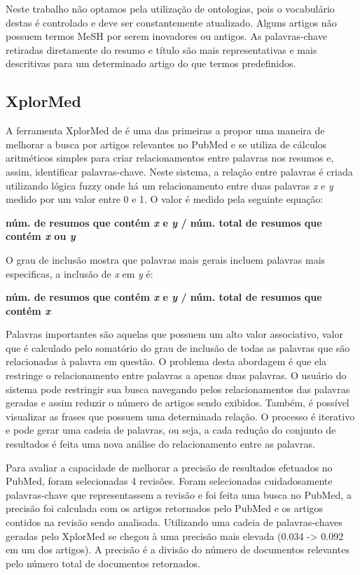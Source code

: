 Neste trabalho não optamos pela utilização de ontologias, pois o vocabulário destas é controlado e deve ser constantemente atualizado. Alguns artigos não possuem termos MeSH por serem inovadores ou antigos. As palavras-chave retiradas diretamente do resumo e título são mais representativas e mais descritivas para um determinado artigo do que termos predefinidos.

\subsection{XplorMed}
A ferramenta XplorMed de \cite{Perez-Iratxeta2001} é uma das primeiras a propor uma maneira de melhorar a busca por artigos relevantes no PubMed e se utiliza de cálculos aritméticos simples para criar relacionamentos entre palavras nos resumos e, assim, identificar palavras-chave. Neste sistema, a relação entre palavras é criada utilizando lógica fuzzy onde há um relacionamento entre duas palavras \emph{x} e \emph{y} medido por um valor entre 0 e 1. O valor é medido pela seguinte equação:

\begin{centering}
\textbf{
núm. de resumos que contém \emph{x} e \emph{y} / núm. total de resumos que contém \emph{x} ou \emph{y}
}
\end{centering}

O grau de inclusão mostra que palavras mais gerais incluem palavras mais especificas, a inclusão de \emph{x} em \emph{y} é:

\begin{centering}
\textbf{
núm. de resumos que contém \emph{x} e \emph{y} / núm. total de resumos que contém \emph{x}
}
\end{centering}

Palavras importantes são aquelas que possuem um alto valor associativo, valor que é calculado pelo somatório do grau de inclusão de todas as palavras que são relacionadas à palavra em questão. O problema desta abordagem é que ela restringe o relacionamento entre palavras a apenas duas palavras. O usuário do sistema pode restringir sua busca navegando pelos relacionamentos das palavras geradas e assim reduzir o número de artigos sendo exibidos. Também, é possível visualizar as frases que possuem uma determinada relação. O processo é iterativo e pode gerar uma cadeia de palavras, ou seja, a cada redução do conjunto de resultados é feita uma nova análise do relacionamento entre as palavras.

Para avaliar a capacidade de melhorar a precisão de resultados efetuados no PubMed, foram selecionadas 4 revisões. Foram selecionadas cuidadosamente palavras-chave que representassem a revisão e foi feita uma busca no PubMed, a precisão foi calculada com os artigos retornados pelo PubMed e os artigos contidos na revisão sendo analisada. Utilizando uma cadeia de palavras-chaves geradas pelo XplorMed se chegou à uma precisão mais elevada (0.034 -> 0.092 em um dos artigos). A precisão é a divisão do número de documentos relevantes pelo número total de documentos retornados.

